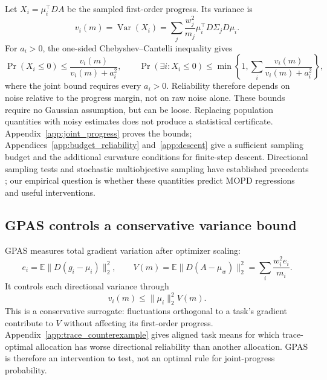 Let $X_i=\mu_i^\top DA$ be the sampled first-order progress. Its variance is
\begin{equation}
    v_i(m)=\operatorname{Var}(X_i)
      =\sum_j\frac{w_j^2}{m_j}
          \mu_i^\top D\Sigma_jD\mu_i.
    \label{eq:directional_variance}
\end{equation}
For $a_i>0$, the one-sided Chebyshev--Cantelli inequality gives
\begin{equation}
    \Pr(X_i\leq0)\leq\frac{v_i(m)}{v_i(m)+a_i^2},\qquad
    \Pr(\exists i:X_i\leq0)
      \leq\min\!\left\{1,\sum_i\frac{v_i(m)}{v_i(m)+a_i^2}\right\},
    \label{eq:directional_reliability}
\end{equation}
where the joint bound requires every $a_i>0$. Reliability therefore
depends on noise relative to the progress margin, not on raw noise alone.
These bounds require no Gaussian assumption, but can be loose. Replacing
population quantities with noisy estimates does not produce a statistical
certificate. Appendix~\ref{app:joint_progress} proves the bounds;
Appendices~\ref{app:budget_reliability} and~\ref{app:descent} give a
sufficient sampling budget and the additional curvature conditions for
finite-step descent. Directional sampling tests and stochastic
multiobjective sampling have established precedents
\citep{bollapragada2018adaptive,zhao2024adaptive}; our empirical question
is whether these quantities predict MOPD regressions and useful interventions.

\subsection{GPAS controls a conservative variance bound}

GPAS measures total gradient variation after optimizer scaling:
\begin{equation}
    e_i=\mathbb E\|D(g_i-\mu_i)\|_2^2,\qquad
    V(m)=\mathbb E\|D(A-\mu_w)\|_2^2
         =\sum_i\frac{w_i^2e_i}{m_i}.
    \label{eq:batch_variance}
\end{equation}
It controls each directional variance through
\begin{equation}
    v_i(m)\leq\|\mu_i\|_2^2 V(m).
    \label{eq:trace_directional_bound}
\end{equation}
This is a conservative surrogate: fluctuations orthogonal to a task's
gradient contribute to $V$ without affecting its first-order progress.
Appendix~\ref{app:trace_counterexample} gives aligned task means for
which trace-optimal allocation has worse directional reliability than
another allocation. GPAS is therefore an intervention to test, not an
optimal rule for joint-progress probability.

